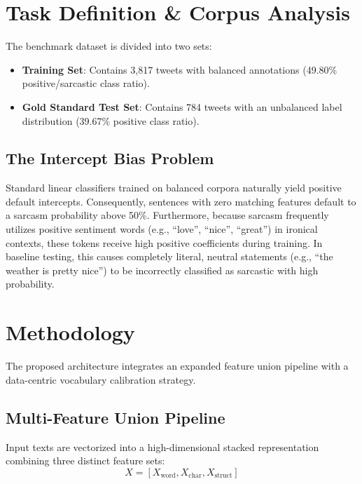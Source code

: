 \documentclass[11pt,a4paper]{article}
\begin{document}
\section{Task Definition \& Corpus Analysis}
The benchmark dataset is divided into two sets:
\begin{itemize}
    \item \textbf{Training Set}: Contains 3,817 tweets with balanced annotations (49.80\% positive/sarcastic class ratio).
    \item \textbf{Gold Standard Test Set}: Contains 784 tweets with an unbalanced label distribution (39.67\% positive class ratio).
\end{itemize}

\subsection{The Intercept Bias Problem}
Standard linear classifiers trained on balanced corpora naturally yield positive default intercepts. Consequently, sentences with zero matching features default to a sarcasm probability above 50\%. Furthermore, because sarcasm frequently utilizes positive sentiment words (e.g., ``love'', ``nice'', ``great'') in ironical contexts, these tokens receive high positive coefficients during training. In baseline testing, this causes completely literal, neutral statements (e.g., ``the weather is pretty nice'') to be incorrectly classified as sarcastic with high probability.

\section{Methodology}
The proposed architecture integrates an expanded feature union pipeline with a data-centric vocabulary calibration strategy.

\subsection{Multi-Feature Union Pipeline}
Input texts are vectorized into a high-dimensional stacked representation combining three distinct feature sets:
\begin{equation}
X = [ X_{\text{word}}, X_{\text{char}}, X_{\text{struct}} ]
\end{equation}
\end{document}
